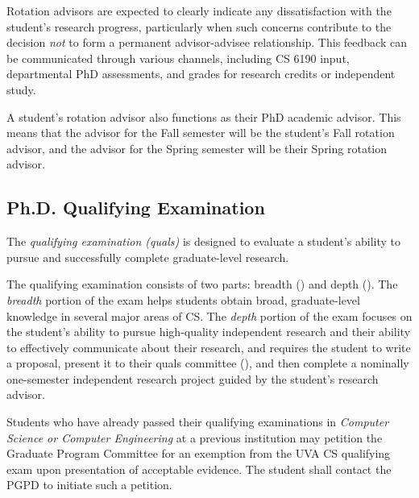 Rotation advisors are expected to clearly indicate any dissatisfaction with the
student’s research progress, particularly when such concerns contribute to the
decision \textit{not} to form a permanent advisor-advisee relationship. This
feedback can be communicated through various channels, including CS 6190 input,
departmental PhD assessments, and grades for research credits or independent
study.

A student's rotation advisor also functions as their PhD academic advisor. This
means that the advisor for the Fall semester will be the student's Fall
rotation advisor, and the advisor for the Spring semester will be their Spring
rotation advisor.

\hypertarget{phd-qualifying-examination}{
\subsection{Ph.D. Qualifying Examination}
\label{phd-qualifying-examination}
}

The \emph{qualifying examination (quals)} is designed to evaluate a
student's ability to pursue and successfully complete graduate-level
research.

The qualifying examination consists of two parts:
breadth () and
depth (). The \emph{breadth}
portion of the exam helps students obtain broad, graduate-level
knowledge in several major areas of CS. The \emph{depth} portion
of the exam focuses on the student's ability to pursue high-quality
independent research and their ability to effectively communicate about their
research, and requires the student to write a proposal, present it to
their quals committee (), and then complete a nominally one-semester
independent research project guided by the student's research advisor.

Students who have already passed their qualifying examinations in
\textit{Computer Science or Computer Engineering} at a previous institution may petition the Graduate
Program Committee for an exemption from the UVA CS qualifying exam upon
presentation of acceptable evidence.
The student shall contact the PGPD to initiate such a petition.


